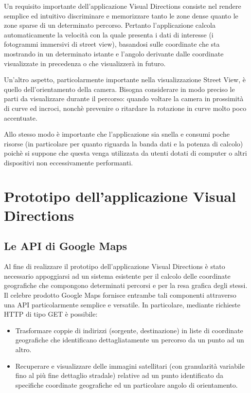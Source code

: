\documentclass[12pt,a4paper,openright, notitlepage]{report}
\begin{document}
Un requisito importante dell’applicazione Visual Directions consiste nel rendere semplice ed intuitivo discriminare e memorizzare tanto le zone dense quanto le zone sparse di un determinato percorso. Pertanto l’applicazione calcola automaticamente la velocità con la quale presenta i dati di interesse (i fotogrammi immersivi di street view), basandosi sulle coordinate che sta mostrando in un determinato istante e l’angolo derivante dalle coordinate visualizzate in precedenza o che visualizzerà in futuro.

Un'altro aspetto, particolarmente importante nella visualizzazione Street View, è quello dell'orientamento della camera. Bisogna considerare in modo preciso le parti da visualizzare durante il percorso: quando voltare la camera in prossimità di curve ed incroci, nonchè prevenire o ritardare la rotazione in curve molto poco accentuate.

Allo stesso modo è importante che l’applicazione sia snella e consumi poche risorse (in particolare per quanto riguarda la banda dati e la potenza di calcolo) poichè si suppone che questa venga utilizzata da utenti dotati di computer o altri dispositivi non eccessivamente performanti. 

\section{Prototipo dell’applicazione Visual Directions}

\subsection{Le API di Google Maps}

Al fine di realizzare il prototipo dell’applicazione Visual Directions è stato necessario appoggiarsi ad un sistema esistente per il calcolo delle coordinate geografiche che compongono determinati percorsi e per la resa grafica degli stessi. Il celebre prodotto Google Maps fornisce entrambe tali componenti attraverso una API particolarmente semplice e versatile. In particolare, mediante richieste HTTP di tipo GET è possibile:

\begin{itemize}
	\item Trasformare coppie di indirizzi (sorgente, destinazione) in liste di coordinate geografiche che identificano dettagliatamente un percorso da un punto ad un altro.
	\item Recuperare e visualizzare delle immagini satellitari (con granularità variabile fino al più fine dettaglio stradale) relative ad un punto identificato da specifiche coordinate geografiche ed un particolare angolo di orientamento.
\end{itemize}
\end{document}
